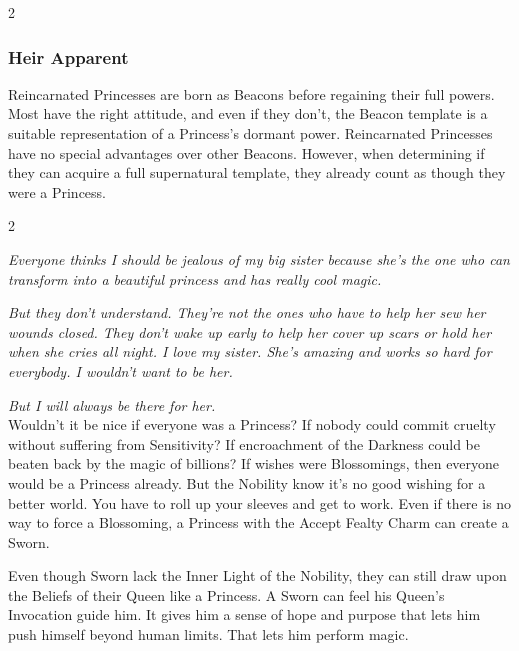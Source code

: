 \begin{multicols}{2}
\begin{mybox}

\subsubsection*{Heir Apparent}

Reincarnated Princesses are born as Beacons before regaining their full powers. Most have the right attitude, and even if they don't, the Beacon template is a suitable representation of a Princess's dormant power. Reincarnated Princesses have no special advantages over other Beacons. However, when determining if they can acquire a full supernatural template, they already count as though they were a Princess.

\end{mybox}

\end{multicols}\label{scha:Sworn}\begin{multicols}{2}\raggedcolumns

\noindent \textit{Everyone thinks I should be jealous of my big sister because she's the one who can transform into a beautiful princess and has really cool magic.}

\textit{But they don't understand. They're not the ones who have to help her sew her wounds closed. They don't wake up early to help her cover up scars or hold her when she cries all night. I love my sister. She's amazing and works so hard for everybody. I wouldn't want to be her.}

\textit{But I will always be there for her.}\\

\noindent Wouldn’t it be nice if everyone was a Princess? If nobody could commit cruelty without suffering from Sensitivity? If encroachment of the Darkness could be beaten back by the magic of billions? If wishes were Blossomings, then everyone would be a Princess already. But the Nobility know it’s no good wishing for a better world. You have to roll up your sleeves and get to work. Even if there is no way to force a Blossoming, a Princess with the Accept Fealty Charm can create a Sworn.

Even though Sworn lack the Inner Light of the Nobility, they can still draw upon the Beliefs of their Queen like a Princess. A Sworn can feel his Queen's Invocation guide him. It gives him a sense of hope and purpose that lets him push himself beyond human limits. That lets him perform magic. 


\end{multicols}
